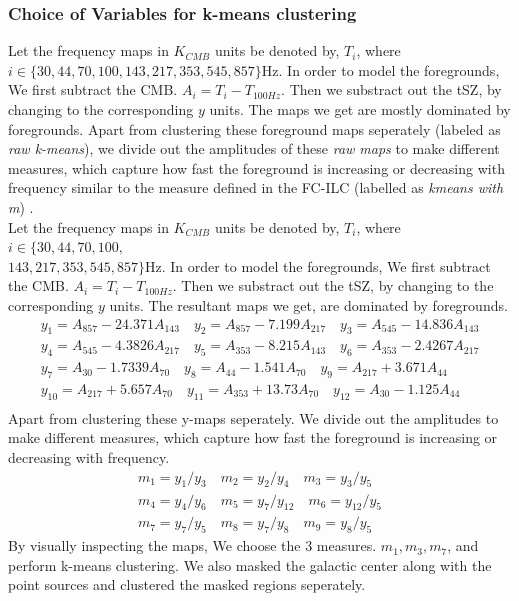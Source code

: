 \subsubsection{Choice of Variables for k-means clustering}
Let the frequency maps in $K_{CMB}$ units be denoted by, $T_i$,
where \\$i \in \{30, 44, 70, 100,143, 217, 353, 545, 857\}$Hz.
In order to model the foregrounds, We first subtract the CMB.
$A_i = T_i - T_{100Hz}$. Then we substract out the tSZ, by changing to the
corresponding $y$ units. The maps we get are mostly dominated by foregrounds.
Apart from clustering these foreground maps seperately
(labeled as \emph{raw k-means}),
we divide out the amplitudes of these \emph{raw maps} to make different measures,
which capture how fast the foreground is increasing or decreasing
with frequency similar to the measure defined in the FC-ILC (labelled as \emph{kmeans with m})
\cite{datarishi}.
\\
Let the frequency maps in $K_{CMB}$ units be denoted by, $T_i$,
where $i \in \{30, 44, 70, 100,$\\ $143, 217, 353, 545, 857\}$Hz.
In order to model the foregrounds, We first subtract the CMB.
$A_i = T_i - T_{100Hz}$. Then we substract out the tSZ, by changing to the
corresponding $y$ units.
The resultant maps we get, are dominated by foregrounds. 
  \begin{align}
y_1 = A_{857} - 24.371 A_{143}\quad y_2 = A_{857} - 7.199 A_{217}\quad y_3 = A_{545} - 14.836 A_{143}\\
y_4 = A_{545} - 4.3826 A_{217}\quad y_5 = A_{353} - 8.215 A_{143}\quad y_6 = A_{353} - 2.4267 A_{217}\\
y_7 = A_{30} - 1.7339 A_{70}\quad y_8 = A_{44} - 1.541 A_{70}\quad y_9 = A_{217} + 3.671 A_{44}\\
y_{10} = A_{217} + 5.657 A_{70}\quad y_{11} = A_{353} + 13.73 A_{70}\quad y_{12} = A_{30} - 1.125 A_{44}\\
  \end{align}
  Apart from clustering these y-maps seperately. We divide out the amplitudes to make different
  measures, which capture how fast the foreground is increasing or decreasing with frequency.
  \begin{align}
m_1 = y_1/y_3 \quad m_2 = y_2/y_4 \quad m_3 = y_3/y_5\\
m_4 = y_4/y_6 \quad m_5 = y_7/y_{12} \quad m_6 = y_{12}/y_5\\
m_7 = y_7/y_5 \quad m_8 = y_7/y_8 \quad m_9 = y_8/y_5
  \end{align}
By visually inspecting the maps, We choose the 3 measures. $m_1, m_3, m_7$,
and perform k-means clustering.
We also masked the galactic center along with the point sources and clustered
the masked regions seperately.
